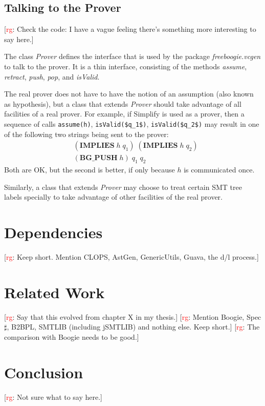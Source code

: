 \documentclass{llncs}
\newcommand{\jmlCode}{\lstinline[style=jml,basicstyle=\normalsize]}
\newcommand{\rg}[1]{{\small [\textcolor{red}{rg}: #1]}}
\begin{document}
\subsection{Talking to the Prover} %

\rg{Check the code: I have a vague feeling there's something more
interesting to say here.}

The class \textit{Prover} defines the interface that is used
by the package \textit{freeboogie.vcgen} to talk to the
prover. It is a thin interface, consisting of the methods
\textit{assume}, \textit{retract}, \textit{push}, \textit{pop},
and \textit{isValid}.

The real prover does not have to have the notion of an
assumption (also known as hypothesis), but a class that extends
\textit{Prover} should take advantage of all facilities of a real
prover. For example, if Simplify is used as a prover, then a
sequence of calls \jmlCode|assume(h)|, \jmlCode|isValid($q_1$)|,
\jmlCode|isValid($q_2$)| may result in one of the following two
strings being sent to the prover:
\begin{align}
&(\mathbf{IMPLIES}\;h\;q_1)\;(\mathbf{IMPLIES}\;h\;q_2)\\
&(\mathbf{BG\_PUSH}\;h)\;q_1\;q_2
\end{align}
Both are OK, but the second is better, if only because
$h$ is communicated once.

Similarly, a class that extends \textit{Prover} may choose to
treat certain SMT tree labels specially to take advantage of
other facilities of the real prover.

\section{Dependencies} %

\rg{Keep short. Mention CLOPS, AstGen, GenericUtils, Guava, the d/l
process.}

\section{Related Work} %

\rg{Say that this evolved from chapter X in my thesis.}
\rg{Mention Boogie, Spec$\sharp$, B2BPL, SMTLIB (including jSMTLIB) and
nothing else. Keep short.}
\rg{The comparison with Boogie needs to be good.}

\section{Conclusion} %

\rg{Not sure what to say here.}



\end{document}
